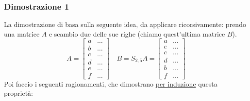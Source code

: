 \subsubsection*{Dimostrazione 1}
La dimostrazione di basa sulla seguente idea, da applicare ricorsivamente: prendo una matrice $ A $ e scambio due delle sue righe (chiamo quest'ultima matrice $ B $).
\[
	A=
	\begin{bmatrix}
		a & \ldots \\b& \ldots\\c& \ldots  \\d& \ldots\\e& \ldots\\f & \ldots
	\end{bmatrix}
	\quad
	B= S_{2 , 5}A=
	\begin{bmatrix}
		a & \ldots \\e& \ldots\\c& \ldots  \\d& \ldots\\b& \ldots\\f & \ldots
	\end{bmatrix}
\]
Poi faccio i seguenti ragionamenti, che dimostrano \underline{per induzione} questa proprietà:
